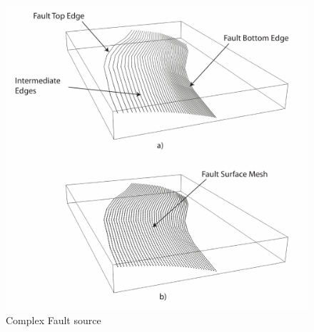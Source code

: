 \begin{figure}[!ht]
\centering
\includegraphics[width=14cm]{./Pictures/ComplexFault.pdf}
\caption{Complex Fault source}
\label{fig:ComplexFaultSource}
\end{figure}
%
